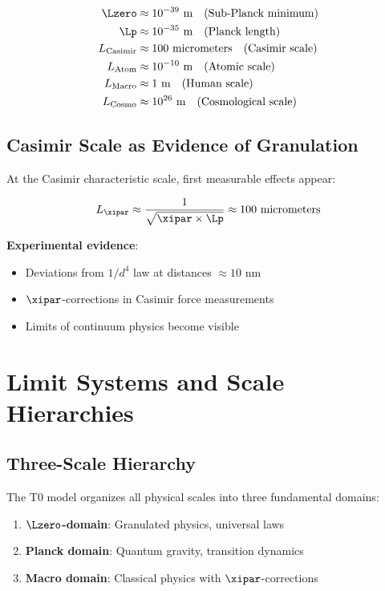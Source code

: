 	\begin{align}
		\Lzero &\approx 10^{-39} \text{ m} \quad \text{(Sub-Planck minimum)} \\
		\Lp &\approx 10^{-35} \text{ m} \quad \text{(Planck length)} \\
		L_{\text{Casimir}} &\approx 100 \text{ micrometers} \quad \text{(Casimir scale)} \\
		L_{\text{Atom}} &\approx 10^{-10} \text{ m} \quad \text{(Atomic scale)} \\
		L_{\text{Macro}} &\approx 1 \text{ m} \quad \text{(Human scale)} \\
		L_{\text{Cosmo}} &\approx 10^{26} \text{ m} \quad \text{(Cosmological scale)}
	\end{align}
	
	\subsection{Casimir Scale as Evidence of Granulation}
	
	At the Casimir characteristic scale, first measurable effects appear:
	
	\begin{equation}
		L_{\xipar} \approx \frac{1}{\sqrt{\xipar \times \Lp}} \approx 100 \text{ micrometers}
	\end{equation}
	
	\textbf{Experimental evidence}:
	\begin{itemize}
		\item Deviations from $1/d^4$ law at distances $\approx 10$ nm
		\item $\xipar$-corrections in Casimir force measurements
		\item Limits of continuum physics become visible
	\end{itemize}
	
	\section{Limit Systems and Scale Hierarchies}
	
	\subsection{Three-Scale Hierarchy}
	
	The T0 model organizes all physical scales into three fundamental domains:
	
	\begin{enumerate}
		\item \textbf{$\Lzero$-domain}: Granulated physics, universal laws
		\item \textbf{Planck domain}: Quantum gravity, transition dynamics
		\item \textbf{Macro domain}: Classical physics with $\xipar$-corrections
	\end{enumerate}
	
